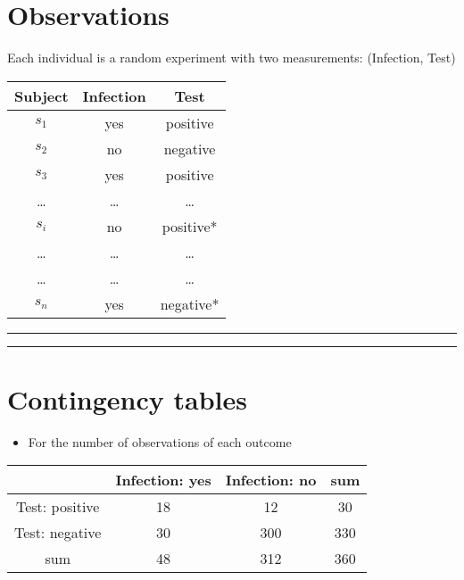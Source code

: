 \documentclass[
]{book}
\providecommand{\tightlist}{%
  \setlength{\itemsep}{0pt}\setlength{\parskip}{0pt}}
\begin{document}
\hypertarget{observations}{%
\section{Observations}\label{observations}}

Each individual is a random experiment with two measurements: (Infection, Test)

\begin{longtable}[]{@{}ccc@{}}
\toprule
Subject & Infection & Test \\
\midrule
\endhead
\(s_1\) & yes & positive \\
\(s_2\) & no & negative \\
\(s_3\) & yes & positive \\
\ldots{} & \ldots{} & \ldots{} \\
\(s_i\) & no & positive* \\
\ldots{} & \ldots{} & \ldots{} \\
\ldots{} & \ldots{} & \ldots{} \\
\(s_n\) & yes & negative* \\
\bottomrule
\end{longtable}

\begin{center}\rule{0.5\linewidth}{0.5pt}\end{center}

\begin{center}\rule{0.5\linewidth}{0.5pt}\end{center}

\hypertarget{contingency-tables}{%
\section{Contingency tables}\label{contingency-tables}}

\begin{itemize}
\tightlist
\item
  For the number of observations of each outcome
\end{itemize}

\begin{longtable}[]{@{}cccc@{}}
\toprule
& Infection: yes & Infection: no & sum \\
\midrule
\endhead
Test: positive & 18 & 12 & 30 \\
Test: negative & 30 & 300 & 330 \\
sum & 48 & 312 & 360 \\
\bottomrule
\end{longtable}
\end{document}
